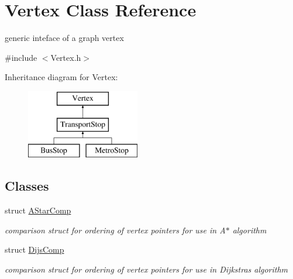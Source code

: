 \hypertarget{class_vertex}{}\section{Vertex Class Reference}
\label{class_vertex}


generic inteface of a graph vertex  




{\ttfamily \#include $<$Vertex.\+h$>$}

Inheritance diagram for Vertex\+:\begin{figure}[H]
\begin{center}
\leavevmode
\includegraphics[height=3.000000cm]{class_vertex}
\end{center}
\end{figure}
\subsection*{Classes}
\begin{DoxyCompactItemize}
\item 
struct \hyperlink{struct_vertex_1_1_a_star_comp}{A\+Star\+Comp}
\begin{DoxyCompactList}\small\item\em comparison struct for ordering of vertex pointers for use in A$\ast$ algorithm \end{DoxyCompactList}\item 
struct \hyperlink{struct_vertex_1_1_dijs_comp}{Dijs\+Comp}
\begin{DoxyCompactList}\small\item\em comparison struct for ordering of vertex pointers for use in Dijkstra\textquotesingle{}s algorithm \end{DoxyCompactList}\end{DoxyCompactItemize}
